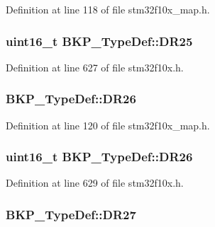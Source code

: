 Definition at line 118 of file stm32f10x\+\_\+map.\+h.

\subsubsection[{\texorpdfstring{D\+R25}{DR25}}]{ {\bf uint16\+\_\+t} B\+K\+P\+\_\+\+Type\+Def\+::\+D\+R25}\hypertarget{struct_b_k_p___type_def_a26779c5c85be6c3a5ea219c980be4ae2}{}\label{struct_b_k_p___type_def_a26779c5c85be6c3a5ea219c980be4ae2}


Definition at line 627 of file stm32f10x.\+h.

\subsubsection[{\texorpdfstring{D\+R26}{DR26}}]{ B\+K\+P\+\_\+\+Type\+Def\+::\+D\+R26}\hypertarget{struct_b_k_p___type_def_af42ed885eb5775200acd8d0d118ef9b9}{}\label{struct_b_k_p___type_def_af42ed885eb5775200acd8d0d118ef9b9}


Definition at line 120 of file stm32f10x\+\_\+map.\+h.

\subsubsection[{\texorpdfstring{D\+R26}{DR26}}]{ {\bf uint16\+\_\+t} B\+K\+P\+\_\+\+Type\+Def\+::\+D\+R26}\hypertarget{struct_b_k_p___type_def_a04dc1fb867bdaa735d2036ac584f541b}{}\label{struct_b_k_p___type_def_a04dc1fb867bdaa735d2036ac584f541b}


Definition at line 629 of file stm32f10x.\+h.

\subsubsection[{\texorpdfstring{D\+R27}{DR27}}]{ B\+K\+P\+\_\+\+Type\+Def\+::\+D\+R27}\hypertarget{struct_b_k_p___type_def_a9c028f4608a2940afa8c11dfebe061b6}{}\label{struct_b_k_p___type_def_a9c028f4608a2940afa8c11dfebe061b6}


